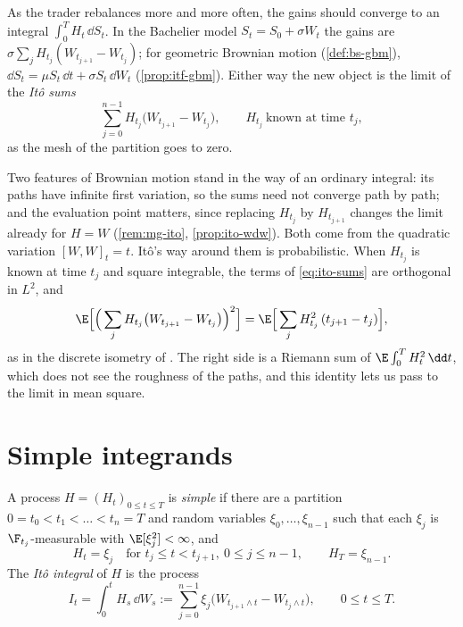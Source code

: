 As the trader rebalances more and more often, the gains should converge to an integral
$\int_0^TH_t\,\dd S_t$. In the Bachelier model $S_t=S_0+\sigma W_t$ the gains are
$\sigma\sum_jH_{t_j}(W_{t_{j+1}}-W_{t_j})$; for geometric Brownian motion (\cref{def:bs-gbm}),
$\dd S_t=\mu S_t\,\dd t+\sigma S_t\,\dd W_t$ (\cref{prop:itf-gbm}). Either way the new object
is the limit of the \emph{It\^o sums}
\begin{equation}\label{eq:ito-sums}
  \sum_{j=0}^{n-1}H_{t_j}\big(W_{t_{j+1}}-W_{t_j}\big),\qquad H_{t_j}\ \text{known at time }t_j,
\end{equation}
as the mesh of the partition goes to zero.

Two features of Brownian motion stand in the way of an ordinary integral: its paths have
infinite first variation, so the sums need not converge path by path; and the evaluation
point matters, since replacing $H_{t_j}$ by $H_{t_{j+1}}$ changes the limit already for $H=W$
(\cref{rem:mg-ito}, \cref{prop:ito-wdw}). Both come from the quadratic variation
$[W,W]_t=t$. It\^o's way around them is probabilistic. When $H_{t_j}$ is known at time $t_j$
and square integrable, the terms of \eqref{eq:ito-sums} are orthogonal in $L^2$, and
\begin{equation}\label{eq:ito-isometry-sums}
  \E\Big[\Big(\sum_jH_{t_j}\big(W_{t_{j+1}}-W_{t_j}\big)\Big)^2\Big]
  =\E\Big[\sum_jH_{t_j}^2\,(t_{j+1}-t_j)\Big],
\end{equation}
as in the discrete isometry of . The right side is a Riemann sum of
$\E\int_0^TH_t^2\,\dd t$, which does not see the roughness of the paths, and this identity
lets us pass to the limit in mean square.

\section{Simple integrands}\label{sec:ito-simple}

\begin{definition}\label{def:ito-simple}
A process $H=(H_t)_{0\le t\le T}$ is \emph{simple} if there are a partition
$0=t_0<t_1<\dots<t_n=T$ and random variables $\xi_0,\dots,\xi_{n-1}$ such that each $\xi_j$
is $\F_{t_j}$-measurable with $\E[\xi_j^2]<\infty$, and
\[
  H_t=\xi_j\quad\text{for }t_j\le t<t_{j+1},\ 0\le j\le n-1,\qquad H_T=\xi_{n-1}.
\]
The \emph{It\^o integral} of $H$ is the process
\begin{equation}\label{eq:ito-simple}
  I_t=\int_0^tH_s\,\dd W_s:=\sum_{j=0}^{n-1}\xi_j\big(W_{t_{j+1}\wedge t}-W_{t_j\wedge t}\big),
  \qquad0\le t\le T .
\end{equation}
\end{definition}

